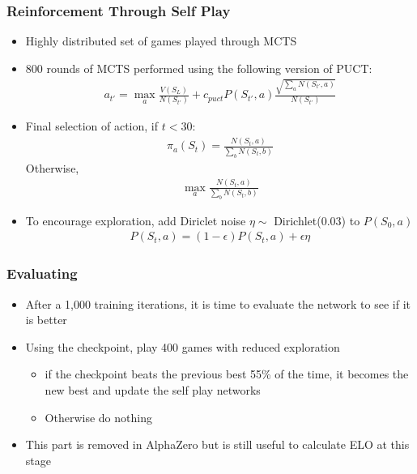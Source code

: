 \documentclass{beamer}
\begin{document}
\begin{frame}
  \frametitle{Reinforcement Through Self Play}

  \begin{itemize}
    \item Highly distributed set of games played through MCTS
    \item 800 rounds of MCTS performed using the following version of PUCT:
      \begin{gather*}
        a_{t'} = \max_a \frac{V(S_L)}{N(S_{t'})} + c_{puct} P(S_{t'}, a) \frac{\sqrt{\sum_a N(S_{t'}, a)}}{N(S_{t'})}
      \end{gather*}
    \item Final selection of action, if $t < 30$:
      \begin{gather*}
        \pi_a(S_t) = \frac{N(S_t, a)}{\sum_b N(S_t, b)}
      \end{gather*}
      Otherwise,
      \begin{gather*}
        \max_a \frac{N(S_t, a)}{\sum_b N(S_t, b)}
      \end{gather*}
    \item To encourage exploration, add Diriclet noise $\eta \sim $ Dirichlet(0.03) to $P(S_0, a)$
      \begin{gather*}
        P(S_t, a) = (1-\epsilon)P(S_t, a) + \epsilon \eta
      \end{gather*}
  \end{itemize}
\end{frame}



\begin{frame}
  \frametitle{Evaluating}

  \begin{itemize}
    \item After a 1,000 training iterations, it is time to evaluate the network to see if it is better
    \item Using the checkpoint, play 400 games with reduced exploration
      \begin{itemize}
        \item if the checkpoint beats the previous best 55\% of the time, it becomes the new best and update the self play networks
        \item Otherwise do nothing
      \end{itemize}
    \item This part is removed in AlphaZero but is still useful to calculate ELO at this stage
  \end{itemize}
\end{frame}
\end{document}
